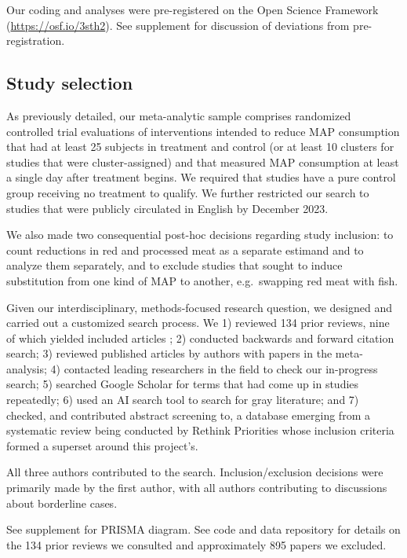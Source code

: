 \documentclass[sn-nature,referee,pdflatex]{sn-jnl}
\begin{document}
Our coding and analyses were pre-registered on the Open Science
Framework (\url{https://osf.io/3sth2}). See supplement for discussion of
deviations from pre-registration.

\subsection{Study selection}\label{sec3.1}

As previously detailed, our meta-analytic sample comprises randomized
controlled trial evaluations of interventions intended to reduce MAP
consumption that had at least 25 subjects in treatment and control (or
at least 10 clusters for studies that were cluster-assigned) and that
measured MAP consumption at least a single day after treatment begins.
We required that studies have a pure control group receiving no
treatment to qualify. We further restricted our search to studies that
were publicly circulated in English by December 2023.

We also made two consequential post-hoc decisions regarding study
inclusion: to count reductions in red and processed meat as a separate
estimand and to analyze them separately, and to exclude studies that
sought to induce substitution from one kind of MAP to another,
e.g.~swapping red meat with fish.

Given our interdisciplinary, methods-focused research question, we
designed and carried out a customized search process. We 1) reviewed 134
prior reviews, nine of which yielded included articles
\citep{mathur2021meta, bianchi2018conscious, bianchi2018restructuring, ammann2023, chang2023, DiGennaro2024, harguess2020, ronto2022, wynes2018};
2) conducted backwards and forward citation search; 3) reviewed
published articles by authors with papers in the meta-analysis; 4)
contacted leading researchers in the field to check our in-progress
search; 5) searched Google Scholar for terms that had come up in studies
repeatedly; 6) used an AI search tool to search for gray literature; and
7) checked, and contributed abstract screening to, a database emerging
from a systematic review being conducted by Rethink Priorities whose
inclusion criteria formed a superset around this project's.

All three authors contributed to the search. Inclusion/exclusion
decisions were primarily made by the first author, with all authors
contributing to discussions about borderline cases.

See supplement for PRISMA diagram. See code and data repository for
details on the 134 prior reviews we consulted and approximately 895
papers we excluded.
\end{document}
